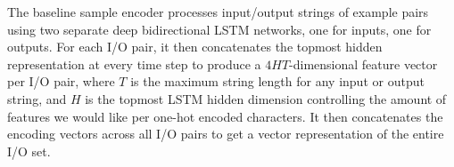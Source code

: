 \documentclass{article}
\begin{document}
The baseline sample encoder processes input/output strings of example pairs
using two separate deep bidirectional LSTM networks,
one for inputs, one for outputs.
For each I/O pair, it then concatenates the topmost hidden representation
at every time step to produce a $4HT$-dimensional feature vector per I/O pair,
where $T$ is the maximum string length for any input or output string,
and $H$ is the topmost LSTM hidden dimension controlling the amount
of features we would like per one-hot encoded characters.
It then concatenates the encoding vectors across all I/O pairs
to get a vector representation of the entire I/O set.~\citep{nsps}

\end{document}
